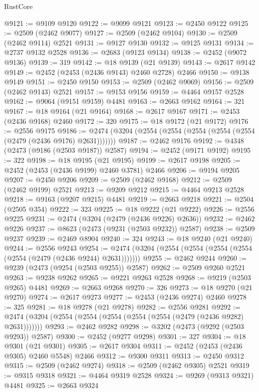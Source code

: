 \begin{lexlean}{RustCore}
\begin{coremodule}
@9121 := @9109 @9120
@9122 := @9099 @9121
@9123 := @2450 @9122
@9125 := @2509 (@2462 @9077)
@9127 := @2509 (@2462 @9104)
@9130 := @2509 (@2462 @9114) @2521
@9131 := @9127 @9130
@9132 := @9125 @9131
@9134 := @2737 @9132 @2528
@9136 := @2683 (@9123 @9134)
@9138 := @2452 (@9072 @9136)
@9139 := 319
@9142 := @18 @9139 (@21 @9139)
@9143 := @2617 @9142
@9149 := @2452 (@2453 (@2436 @9143) @2460 @2728) @2466
@9150 := @9138 @9149
@9151 := @2450 @9150
@9153 := @2509 (@2462 @9069)
@9156 := @2509 (@2462 @9143) @2521
@9157 := @9153 @9156
@9159 := @4464 @9157 @2528
@9162 := @9064 (@9151 @9159) @4481
@9163 := @2663 @9162
@9164 := 321
@9167 := @18 @9164 (@21 @9164)
@9168 := @2617 @9167
@9171 := @2453 (@2436 @9168) @2460
@9172 := 320
@9175 := @18 @9172 (@21 @9172)
@9176 := @2556 @9175
@9186 := @2474 (@3204 (@2554 (@2554 (@2554 (@2554 (@2554 (@2479 (@2436 @9176) @2631)))))))
@9187 := @2462 @9176
@9192 := @4348 (@2473 (@9186 (@2503 @9187)) @2587)
@9194 := @2452 (@9171 @9192)
@9195 := 322
@9198 := @18 @9195 (@21 @9195)
@9199 := @2617 @9198
@9205 := @2452 (@2453 (@2436 @9199) @2460 @3781) @2466
@9206 := @9194 @9205
@9207 := @2450 @9206
@9209 := @2509 (@2462 @9168)
@9212 := @2509 (@2462 @9199) @2521
@9213 := @9209 @9212
@9215 := @4464 @9213 @2528
@9218 := @9163 (@9207 @9215) @4481
@9219 := @2663 @9218
@9221 := @2504 (@2505 @354)
@9222 := 323
@9225 := @18 @9222 (@21 @9222)
@9226 := @2556 @9225
@9231 := @2474 (@3204 (@2479 (@2436 @9226) @2636))
@9232 := @2462 @9226
@9237 := @8623 (@2473 (@9231 (@2503 @9232)) @2587)
@9238 := @2509 @9237
@9239 := @2469 @8904
@9240 := 324
@9243 := @18 @9240 (@21 @9240)
@9244 := @2556 @9243
@9254 := @2474 (@3204 (@2554 (@2554 (@2554 (@2554 (@2554 (@2479 (@2436 @9244) @2631)))))))
@9255 := @2462 @9244
@9260 := @9239 (@2473 (@9254 (@2503 @9255)) @2587)
@9262 := @2509 @9260 @2521
@9263 := @9238 @9262
@9265 := @9221 @9263 @2528
@9268 := @9219 (@2503 @9265) @4481
@9269 := @2663 @9268
@9270 := 326
@9273 := @18 @9270 (@21 @9270)
@9274 := @2617 @9273
@9277 := @2453 (@2436 @9274) @2460
@9278 := 325
@9281 := @18 @9278 (@21 @9278)
@9282 := @2556 @9281
@9292 := @2474 (@3204 (@2554 (@2554 (@2554 (@2554 (@2554 (@2479 (@2436 @9282) @2631)))))))
@9293 := @2462 @9282
@9298 := @3202 (@2473 (@9292 (@2503 @9293)) @2587)
@9300 := @2452 (@9277 @9298)
@9301 := 327
@9304 := @18 @9301 (@21 @9301)
@9305 := @2617 @9304
@9311 := @2452 (@2453 (@2436 @9305) @2460 @5548) @2466
@9312 := @9300 @9311
@9313 := @2450 @9312
@9315 := @2509 (@2462 @9274)
@9318 := @2509 (@2462 @9305) @2521
@9319 := @9315 @9318
@9321 := @4464 @9319 @2528
@9324 := @9269 (@9313 @9321) @4481
@9325 := @2663 @9324

\end{coremodule}
\end{lexlean}
